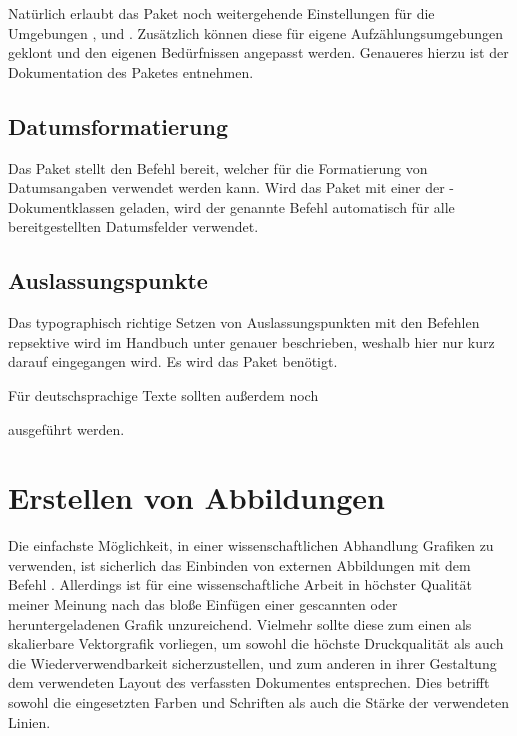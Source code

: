 \documentclass[%
  english,ngerman,%
  geometry=no,DIV=12,automark,%
]{tudscrartcl}
\begin{document}
Natürlich erlaubt das Paket noch weitergehende Einstellungen für die Umgebungen 
,  und . 
Zusätzlich können diese für eigene Aufzählungsumgebungen geklont und den 
eigenen Bedürfnissen angepasst werden. Genaueres hierzu ist der Dokumentation 
des Paketes  entnehmen.


\subsection{Datumsformatierung}
Das Paket  stellt den Befehl  bereit, welcher 
für die Formatierung von Datumsangaben verwendet werden kann. Wird das Paket 
mit einer der \TUDScript-Dokumentklassen geladen, wird der genannte Befehl 
automatisch für alle bereitgestellten Datumsfelder verwendet.
%
\begin{Preamble}
\usepackage{isodate}

\end{Preamble}


\subsection{Auslassungspunkte}
Das typographisch richtige Setzen von Auslassungspunkten mit den Befehlen 
 repsektive  wird im Handbuch unter 
 genauer 
beschrieben, weshalb hier nur kurz darauf eingegangen wird. Es wird das Paket 
 benötigt.
%
\begin{Preamble}
\usepackage{ellipsis}
\end{Preamble}
%
Für deutschsprachige Texte sollten außerdem noch 
%
\begin{Preamble}
\let\ellipsispunctuation\relax

\end{Preamble}
%
ausgeführt werden.



\section{Erstellen von Abbildungen}
\label{sec:figures}
Die einfachste Möglichkeit, in einer wissenschaftlichen Abhandlung Grafiken zu 
verwenden, ist sicherlich das Einbinden von externen Abbildungen mit dem Befehl 
. Allerdings ist für eine wissenschaftliche Arbeit in 
höchster Qualität meiner Meinung nach das bloße Einfügen einer gescannten oder 
heruntergeladenen Grafik unzureichend. Vielmehr sollte diese zum einen als 
skalierbare Vektorgrafik vorliegen, um sowohl die höchste Druckqualität als 
auch die Wiederverwendbarkeit sicherzustellen, und zum anderen in ihrer 
Gestaltung dem verwendeten Layout des verfassten Dokumentes entsprechen. Dies 
betrifft sowohl die eingesetzten Farben und Schriften als auch die Stärke der 
verwendeten Linien.
\end{document}
